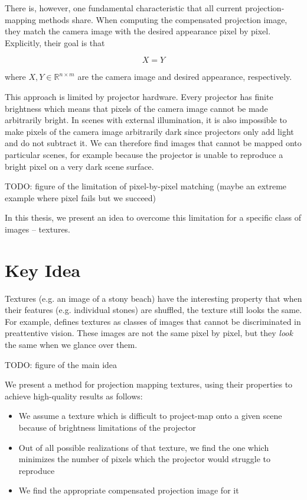 There is, however, one fundamental characteristic that all current projection-mapping methods share. When computing the compensated projection image, they match the camera image with the desired appearance pixel by pixel. Explicitly, their goal is that

\[
    X = Y
\]

where \(X,Y \in \mathbb{R}^{n \times m}\) are the camera image and desired appearance, respectively.

This approach is limited by projector hardware. Every projector has finite brightness which means that pixels of the camera image cannot be made arbitrarily bright. In scenes with external illumination, it is also impossible to make pixels of the camera image arbitrarily dark since projectors only add light and do not subtract it. We can therefore find images that cannot be mapped onto particular scenes, for example because the projector is unable to reproduce a bright pixel on a very dark scene surface.

{\color{red} TODO: figure of the limitation of pixel-by-pixel matching (maybe an extreme example where pixel fails but we succeed)}

In this thesis, we present an idea to overcome this limitation for a specific class of images -- textures.

\section{Key Idea}
\label{section:intro-key_idea}

Textures (e.g. an image of a stony beach) have the interesting property that when their features (e.g. individual stones) are shuffled, the texture still looks the same. For example, \citet*{Julesz1995} defines textures as classes of images that cannot be discriminated in preattentive vision. These images are not the same pixel by pixel, but they \textit{look} the same when we glance over them.

{\color{red} TODO: figure of the main idea}

We present a method for projection mapping textures, using their properties to achieve high-quality results as follows:

\begin{itemize}
    \item We assume a texture which is difficult to project-map onto a given scene because of brightness limitations of the projector
    \item Out of all possible realizations of that texture, we find the one which minimizes the number of pixels which the projector would struggle to reproduce
    \item We find the appropriate compensated projection image for it
\end{itemize}

